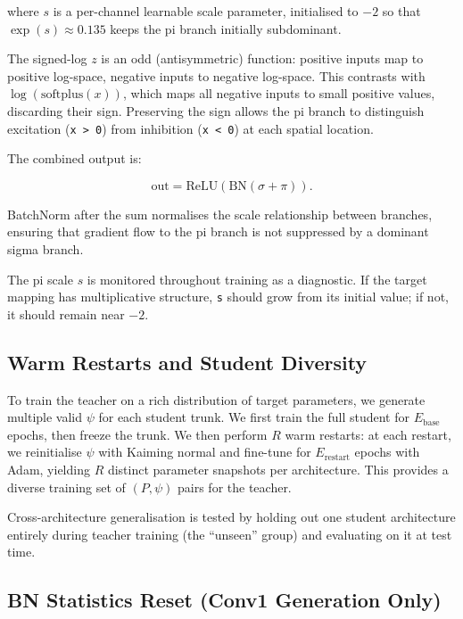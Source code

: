 \documentclass{article}
\begin{document}
where $s$ is a per-channel learnable scale parameter, initialised to $-2$ so that $\exp(s)\approx0.135$ keeps the pi branch initially subdominant.

The signed-log $z$ is an odd (antisymmetric) function: positive inputs map to positive log-space, negative inputs to negative log-space. This contrasts with $\log(\mathrm{softplus}(x))$, which maps all negative inputs to small positive values, discarding their sign. Preserving the sign allows the pi branch to distinguish excitation (\texttt{x\ \textgreater{}\ 0}) from inhibition (\texttt{x\ \textless{}\ 0}) at each spatial location.

The combined output is:

\begin{equation}
\mathrm{out} = \mathrm{ReLU}\left(\mathrm{BN}(\sigma + \pi)\right).
\end{equation}

BatchNorm after the sum normalises the scale relationship between branches, ensuring that gradient flow to the pi branch is not suppressed by a dominant sigma branch.

The pi scale $s$ is monitored throughout training as a diagnostic. If the target mapping has multiplicative structure, \texttt{s} should grow from its initial value; if not, it should remain near $-2$.

\subsection{Warm Restarts and Student Diversity}\label{warm-restarts-and-student-diversity}

To train the teacher on a rich distribution of target parameters, we generate multiple valid $\psi$ for each student trunk. We first train the full student for $E_{\mathrm{base}}$ epochs, then freeze the trunk. We then perform $R$ warm restarts: at each restart, we reinitialise $\psi$ with Kaiming normal and fine-tune for $E_{\mathrm{restart}}$ epochs with Adam, yielding $R$ distinct parameter snapshots per architecture. This provides a diverse training set of $(P,\psi)$ pairs for the teacher.

Cross-architecture generalisation is tested by holding out one student architecture entirely during teacher training (the ``unseen'' group) and evaluating on it at test time.

\subsection{BN Statistics Reset (Conv1 Generation Only)}\label{bn-statistics-reset-conv1-generation-only}
\end{document}
